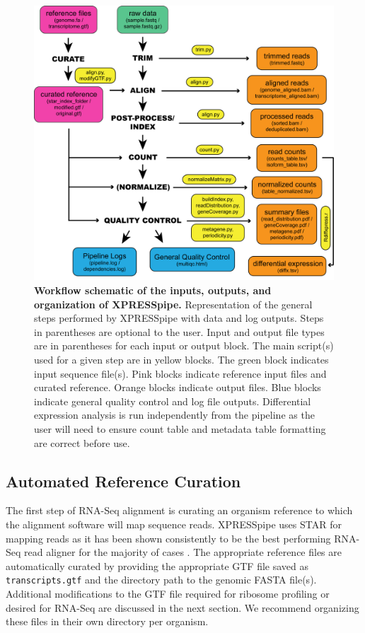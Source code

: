 \documentclass[10pt, oneside]{article}
\begin{document}
\begin{figure}
\centering
  \includegraphics[width=160mm]{figures/xpresspipe_figure1.png}
  \caption{\textbf{Workflow schematic of the inputs, outputs, and organization of XPRESSpipe.} Representation of the general steps performed by XPRESSpipe with data and log outputs. Steps in parentheses are optional to the user. Input and output file types are in parentheses for each input or output block. The main script(s) used for a given step are in yellow blocks. The green block indicates input sequence file(s). Pink blocks indicate reference input files and curated reference. Orange blocks indicate output files. Blue blocks indicate general quality control and log file outputs. Differential expression analysis is run independently from the pipeline as the user will need to ensure count table and metadata table formatting are correct before use.}
  \label{fig:outputs}
\end{figure}

\subsection*{Automated Reference Curation}
The first step of RNA-Seq alignment is curating an organism reference to which the alignment software will map sequence reads. XPRESSpipe uses STAR \cite{star} for mapping reads as it has been shown consistently to be the best performing RNA-Seq read aligner for the majority of cases \cite{alignment_benchmark, alignment_benchmark2}. The appropriate reference files are automatically curated by providing the appropriate GTF file saved as \texttt{transcripts.gtf} and the directory path to the genomic FASTA file(s). Additional modifications to the GTF file required for ribosome profiling or desired for RNA-Seq are discussed in the next section. We recommend organizing these files in their own directory per organism.\\
\end{document}
